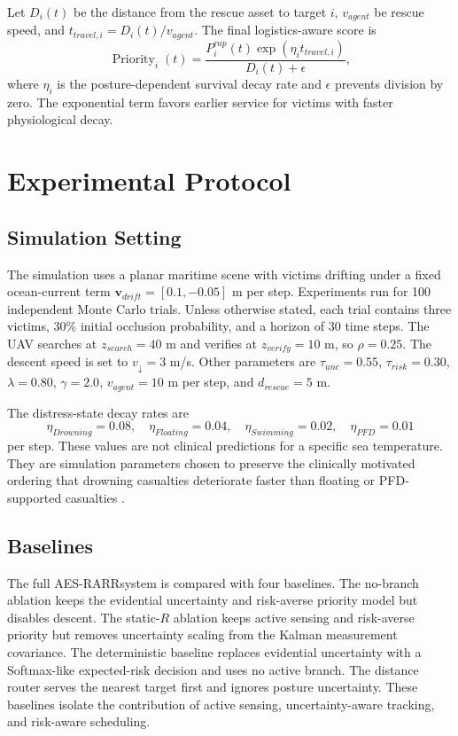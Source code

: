 \documentclass[runningheads]{llncs}
\newcommand{\operatorname}[1]{\mathop{\mathrm{#1}}}
\newcommand{\aes}{AES-RARR}
\begin{document}
Let $D_i(t)$ be the distance from the rescue asset to target $i$, $v_{agent}$ be rescue speed, and $t_{travel,i}=D_i(t)/v_{agent}$. The final logistics-aware score is
\begin{equation}
  \operatorname{Priority}_i(t)=
  \frac{P^{rap}_i(t)\exp(\eta_i t_{travel,i})}{D_i(t)+\epsilon},
  \label{eq:priority}
\end{equation}
where $\eta_i$ is the posture-dependent survival decay rate and $\epsilon$ prevents division by zero. The exponential term favors earlier service for victims with faster physiological decay.

\section{Experimental Protocol}

\subsection{Simulation Setting}

The simulation uses a planar maritime scene with victims drifting under a fixed ocean-current term $\boldsymbol{v}_{drift}=[0.1,-0.05]$ m per step. Experiments run for 100 independent Monte Carlo trials. Unless otherwise stated, each trial contains three victims, 30\% initial occlusion probability, and a horizon of 30 time steps. The UAV searches at $z_{search}=40$ m and verifies at $z_{verify}=10$ m, so $\rho=0.25$. The descent speed is set to $v_{\downarrow}=3$ m/s. Other parameters are $\tau_{unc}=0.55$, $\tau_{risk}=0.30$, $\lambda=0.80$, $\gamma=2.0$, $v_{agent}=10$ m per step, and $d_{rescue}=5$ m.

The distress-state decay rates are
\begin{equation}
  \eta_{Drowning}=0.08,\quad \eta_{Floating}=0.04,\quad
  \eta_{Swimming}=0.02,\quad \eta_{PFD}=0.01
\end{equation}
per step. These values are not clinical predictions for a specific sea temperature. They are simulation parameters chosen to preserve the clinically motivated ordering that drowning casualties deteriorate faster than floating or PFD-supported casualties \cite{golden2002,tipton2011,bierens2016}.

\subsection{Baselines}

The full \aes system is compared with four baselines. The no-branch ablation keeps the evidential uncertainty and risk-averse priority model but disables descent. The static-$R$ ablation keeps active sensing and risk-averse priority but removes uncertainty scaling from the Kalman measurement covariance. The deterministic baseline replaces evidential uncertainty with a Softmax-like expected-risk decision and uses no active branch. The distance router serves the nearest target first and ignores posture uncertainty. These baselines isolate the contribution of active sensing, uncertainty-aware tracking, and risk-aware scheduling.
\end{document}
